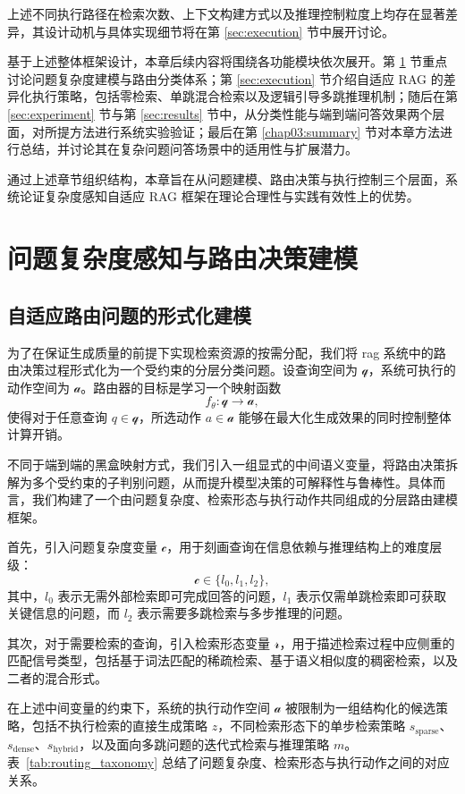 上述不同执行路径在检索次数、上下文构建方式以及推理控制粒度上均存在显著差异，其设计动机与具体实现细节将在第 \ref{sec:execution} 节中展开讨论。

基于上述整体框架设计，本章后续内容将围绕各功能模块依次展开。第 \ref{chap03:perception} 节重点讨论问题复杂度建模与路由分类体系；第 \ref{sec:execution} 节介绍自适应 RAG 的差异化执行策略，包括零检索、单跳混合检索以及逻辑引导多跳推理机制；随后在第 \ref{sec:experiment} 节与第 \ref{sec:results} 节中，从分类性能与端到端问答效果两个层面，对所提方法进行系统实验验证；最后在第 \ref{chap03:summary} 节对本章方法进行总结，并讨论其在复杂问题问答场景中的适用性与扩展潜力。

通过上述章节组织结构，本章旨在从问题建模、路由决策与执行控制三个层面，系统论证复杂度感知自适应 RAG 框架在理论合理性与实践有效性上的优势。

\section{问题复杂度感知与路由决策建模}\label{chap03:perception}

\subsection{自适应路由问题的形式化建模}

为了在保证生成质量的前提下实现检索资源的按需分配，我们将 rag 系统中的路由决策过程形式化为一个受约束的分层分类问题。设查询空间为 $\mathcal{q}$，系统可执行的动作空间为 $\mathcal{a}$。路由器的目标是学习一个映射函数
\[
f_\theta: \mathcal{q} \rightarrow \mathcal{a},
\]
使得对于任意查询 $q \in \mathcal{q}$，所选动作 $a \in \mathcal{a}$ 能够在最大化生成效果的同时控制整体计算开销。

不同于端到端的黑盒映射方式，我们引入一组显式的中间语义变量，将路由决策拆解为多个受约束的子判别问题，从而提升模型决策的可解释性与鲁棒性。具体而言，我们构建了一个由问题复杂度、检索形态与执行动作共同组成的分层路由建模框架。

首先，引入问题复杂度变量 $\mathcal{c}$，用于刻画查询在信息依赖与推理结构上的难度层级：
\[
\mathcal{c} \in \{l_0, l_1, l_2\},
\]
其中，$l_0$ 表示无需外部检索即可完成回答的问题，$l_1$ 表示仅需单跳检索即可获取关键信息的问题，而 $l_2$ 表示需要多跳检索与多步推理的问题。

其次，对于需要检索的查询，引入检索形态变量 $\mathcal{r}$，用于描述检索过程中应侧重的匹配信号类型，包括基于词法匹配的稀疏检索、基于语义相似度的稠密检索，以及二者的混合形式。

在上述中间变量的约束下，系统的执行动作空间 $\mathcal{a}$ 被限制为一组结构化的候选策略，包括不执行检索的直接生成策略 $z$，不同检索形态下的单步检索策略 $s_{\text{sparse}}$、$s_{\text{dense}}$、$s_{\text{hybrid}}$，以及面向多跳问题的迭代式检索与推理策略 $m$。表~\ref{tab:routing_taxonomy} 总结了问题复杂度、检索形态与执行动作之间的对应关系。

